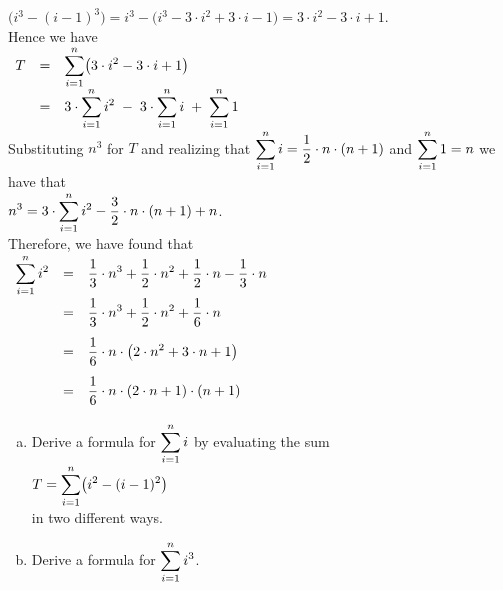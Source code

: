$ \bigl(i^3 - (i-1)^3\bigr) = i^3 - \bigl(i^3 - 3 \cdot i^2 + 3 \cdot i - 1) = 3 \cdot i^2 - 3 \cdot i + 1$.
\\[0.2cm]
Hence we have
\\[0.2cm]
\hspace*{1.3cm}
$
\begin{array}{lclcl}
  T & = & \displaystyle \sum\limits_{i=1}^n \bigl(3 \cdot i^2 - 3 \cdot i + 1\bigr) \\[0.2cm]
    & = & \displaystyle 3 \cdot \sum\limits_{i=1}^n i^2 \; -\;  3 \cdot \sum\limits_{i=1}^n i \;+\; \sum\limits_{i=1}^n 1
\end{array}
$
\\[0.2cm]
Substituting $n^3$ for $T$ and realizing that $\displaystyle\sum\limits_{i=1}^n i = \frac{1}{2} \cdot n \cdot (n+1)$ and
$\displaystyle\sum\limits_{i=1}^n 1 = n$ we have that
\\[0.2cm]
\hspace*{1.3cm}
$\displaystyle n^3 = 3 \cdot \sum\limits_{i=1}^n i^2 - \frac{3}{2} \cdot n \cdot (n+1) + n$.
\\[0.2cm]
Therefore, we have found that
\\[0.2cm]
\hspace*{1.3cm}
$
\begin{array}{lcl}
\displaystyle \sum\limits_{i=1}^n i^2 & = &  \displaystyle\frac{1}{3} \cdot n^3 + \frac{1}{2} \cdot n^2 + \frac{1}{2} \cdot n -
                                  \frac{1}{3} \cdot n  \\[0.4cm]
                          & = &   \displaystyle\frac{1}{3} \cdot n^3 + \frac{1}{2} \cdot n^2 + \frac{1}{6} \cdot n
  \\[0.4cm]
                         & = &   \displaystyle\frac{1}{6} \cdot n \cdot \bigl(2 \cdot n^2 + 3 \cdot n + 1 \bigr)
  \\[0.4cm]
                         & = &   \displaystyle\frac{1}{6} \cdot n \cdot (2 \cdot n + 1) \cdot (n + 1)  \\[0.2cm]
\end{array}
$

\exercise
\begin{enumerate}[(a)]
\item Derive a formula for $\displaystyle\sum\limits_{i=1}^n i$ by evaluating the sum \\
      \hspace*{1.3cm}
      $\displaystyle T = \sum\limits_{i=1}^n \bigl(i^2 - (i-1)^2\bigr)$
      \\[0.2cm]
      in two different ways.  
\item Derive a formula for $\displaystyle\sum\limits_{i=1}^n i^3$.   \eoxs
\end{enumerate}

